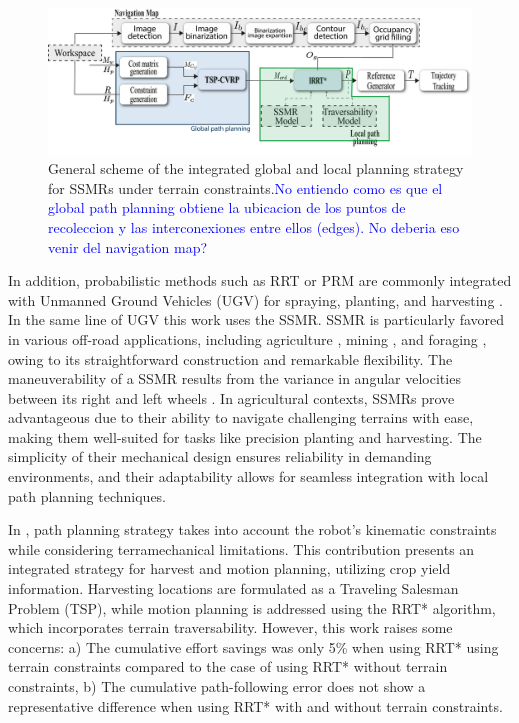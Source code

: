 \documentclass[conference]{IEEEtran}
\newcommand{\revL}[1]{\textcolor{blue}{#1}}
\begin{document}
\begin{figure}[t!]
	\centering
 \includegraphics[width=\linewidth]{Images/methodology_5.pdf}
	\caption{General scheme of the integrated global and local planning strategy for SSMRs under terrain constraints.\revL{No entiendo como es que el global path planning obtiene la ubicacion de los puntos de recoleccion y las interconexiones entre ellos (edges). No deberia eso venir del navigation map?}}
	\label{Fig::esquema_basico_planificacion}
\end{figure}


In addition, probabilistic methods such as RRT or PRM are commonly integrated with Unmanned Ground Vehicles (UGV) for spraying, planting, and harvesting \cite{Papadakis2013, ALMILLI2010151, Fernandez2019, Milos2022, Dereci2022}. In the same line of UGV this work uses the SSMR. SSMR is particularly favored in various off-road applications, including agriculture \cite{Dutta2019}, mining \cite{Szrek2022}, and foraging \cite{Auzan2022}, owing to its straightforward construction and remarkable flexibility. The maneuverability of a SSMR results from the variance in angular velocities between its right and left wheels \cite{Tagliavini2022}. In agricultural contexts, SSMRs prove advantageous due to their ability to navigate challenging terrains with ease, making them well-suited for tasks like precision planting and harvesting. The simplicity of their mechanical design ensures reliability in demanding environments, and their adaptability allows for seamless integration with local path planning techniques.

In \cite{Auat2017}, path planning strategy takes into account the robot's kinematic constraints while considering terramechanical limitations. This contribution presents an integrated strategy for harvest and motion planning, utilizing crop yield information. Harvesting locations are formulated as a Traveling Salesman Problem (TSP), while motion planning is addressed using the RRT* algorithm, which incorporates terrain traversability. However, this work raises some concerns: a) The cumulative effort savings was only 5\% when using RRT* using terrain constraints compared to the case of using RRT* without terrain constraints, b) The cumulative path-following error does not show a representative difference when using RRT* with and without terrain constraints. 
\end{document}
